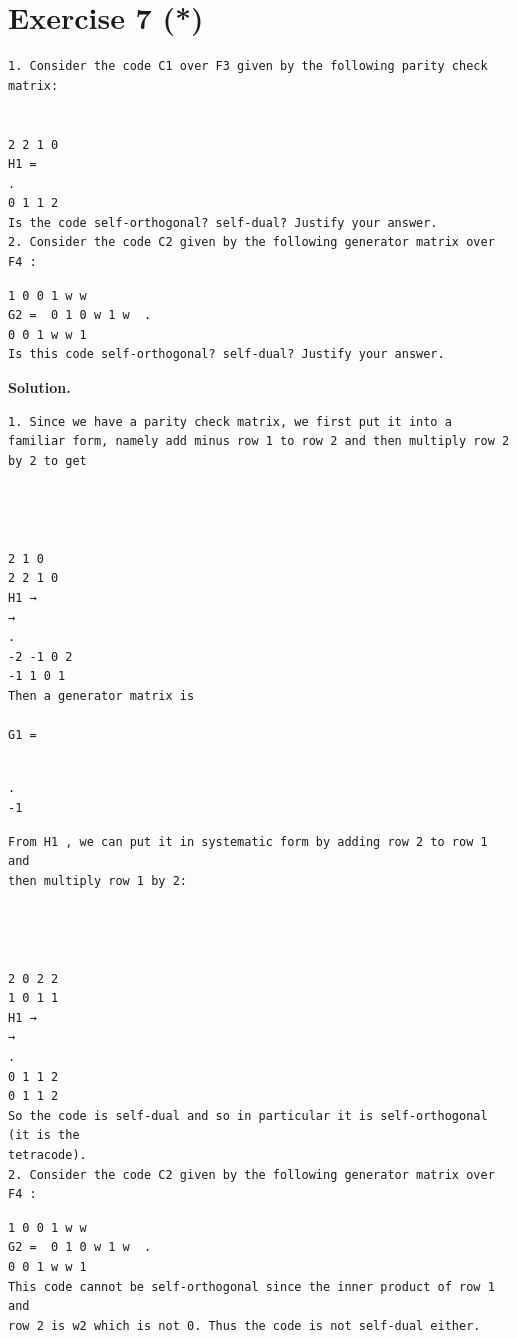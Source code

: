 \documentclass[11pt]{article}
\begin{document}
\section*{Exercise 7 (*)}
\begin{exercisebox}
\begin{Verbatim}[fontsize=\small]
1. Consider the code C1 over F3 given by the following parity check matrix:


2 2 1 0
H1 =
.
0 1 1 2
Is the code self-orthogonal? self-dual? Justify your answer.
2. Consider the code C2 given by the following generator matrix over F4 :
\end{Verbatim}
\begin{Verbatim}[fontsize=\small]
1 0 0 1 w w
G2 =  0 1 0 w 1 w  .
0 0 1 w w 1
Is this code self-orthogonal? self-dual? Justify your answer.
\end{Verbatim}
\end{exercisebox}
\begin{solutionbox}
\textbf{Solution.}

\begin{Verbatim}[fontsize=\small]
1. Since we have a parity check matrix, we first put it into a
familiar form, namely add minus row 1 to row 2 and then multiply row 2
by 2 to get




2 1 0
2 2 1 0
H1 →
→
.
-2 -1 0 2
-1 1 0 1
Then a generator matrix is

G1 =
\end{Verbatim}
\begin{Verbatim}[fontsize=\small]

.
-1
\end{Verbatim}
\begin{Verbatim}[fontsize=\small]
From H1 , we can put it in systematic form by adding row 2 to row 1 and
then multiply row 1 by 2:




2 0 2 2
1 0 1 1
H1 →
→
.
0 1 1 2
0 1 1 2
So the code is self-dual and so in particular it is self-orthogonal (it is the
tetracode).
2. Consider the code C2 given by the following generator matrix over F4 :
\end{Verbatim}
\begin{Verbatim}[fontsize=\small]
1 0 0 1 w w
G2 =  0 1 0 w 1 w  .
0 0 1 w w 1
This code cannot be self-orthogonal since the inner product of row 1 and
row 2 is w2 which is not 0. Thus the code is not self-dual either.
\end{Verbatim}
\end{solutionbox}
\end{document}

